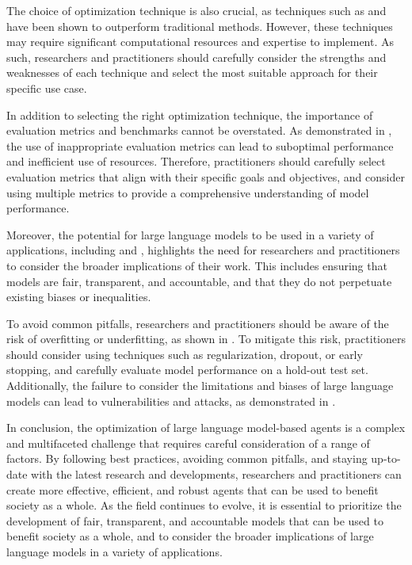 \documentclass[11pt]{article}
\begin{document}
The choice of optimization technique is also crucial, as techniques such as \cite{ref165} and \cite{ref365} have been shown to outperform traditional methods. However, these techniques may require significant computational resources and expertise to implement. As such, researchers and practitioners should carefully consider the strengths and weaknesses of each technique and select the most suitable approach for their specific use case.

In addition to selecting the right optimization technique, the importance of evaluation metrics and benchmarks cannot be overstated. As demonstrated in \cite{ref173}, the use of inappropriate evaluation metrics can lead to suboptimal performance and inefficient use of resources. Therefore, practitioners should carefully select evaluation metrics that align with their specific goals and objectives, and consider using multiple metrics to provide a comprehensive understanding of model performance.

Moreover, the potential for large language models to be used in a variety of applications, including \cite{ref49} and \cite{ref366}, highlights the need for researchers and practitioners to consider the broader implications of their work. This includes ensuring that models are fair, transparent, and accountable, and that they do not perpetuate existing biases or inequalities.

To avoid common pitfalls, researchers and practitioners should be aware of the risk of overfitting or underfitting, as shown in \cite{ref86}. To mitigate this risk, practitioners should consider using techniques such as regularization, dropout, or early stopping, and carefully evaluate model performance on a hold-out test set. Additionally, the failure to consider the limitations and biases of large language models can lead to vulnerabilities and attacks, as demonstrated in \cite{ref367}.

In conclusion, the optimization of large language model-based agents is a complex and multifaceted challenge that requires careful consideration of a range of factors. By following best practices, avoiding common pitfalls, and staying up-to-date with the latest research and developments, researchers and practitioners can create more effective, efficient, and robust agents that can be used to benefit society as a whole. As the field continues to evolve, it is essential to prioritize the development of fair, transparent, and accountable models that can be used to benefit society as a whole, and to consider the broader implications of large language models in a variety of applications.
\end{document}
